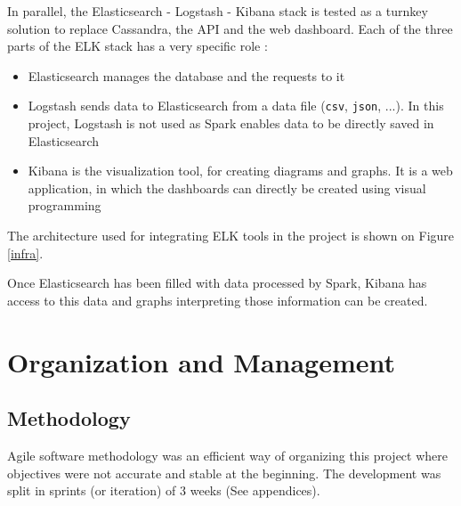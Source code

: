\documentclass[11pt]{article}
\begin{document}
In parallel, the \textsf{Elasticsearch} - \textsf{Logstash} - \textsf{Kibana} stack is tested as a turnkey solution to replace \textsf{Cassandra}, the API and the web dashboard.
Each of the three parts of the \textsf{ELK} stack has a very specific role : 
\begin{itemize}
\item \textsf{Elasticsearch} manages the database and the requests to it
\item \textsf{Logstash} sends data to \textsf{Elasticsearch} from a data file (\texttt{csv}, \texttt{json}, ...). In this project, \textsf{Logstash} is not used as \textsf{Spark} enables data to be directly saved in \textsf{Elasticsearch}
\item \textsf{Kibana} is the visualization tool, for creating diagrams and graphs. It is a web application, in which the dashboards can directly be created using visual programming
\end{itemize}

The architecture used for integrating \textsf{ELK} tools in the project is shown on Figure \ref*{infra}.


Once \textsf{Elasticsearch} has been filled with data processed by \textsf{Spark}, \textsf{Kibana} has access to this data and graphs interpreting those information can be created.

%
%

\section{Organization and Management}

\subsection{Methodology}

Agile software methodology was an efficient way of organizing this project where objectives were not accurate and stable at the beginning. The development was split in sprints (or iteration) of 3 weeks (See appendices).
\end{document}
